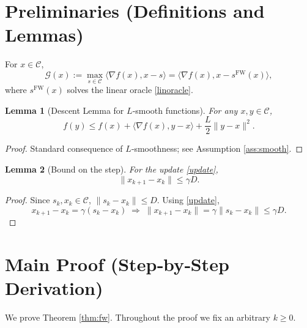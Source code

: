 \documentclass{article}
\newtheorem{lemma}{Lemma}
\newcommand{\Cset}{\mathcal{C}}
\newcommand{\grad}{\nabla}
\newcommand{\gap}{\mathcal{G}}
\newcommand{\inner}[2]{\langle #1,#2\rangle}
\begin{document}
\section*{Preliminaries (Definitions and Lemmas)}
\begin{definition}[FW gap]
For $x\in\Cset$,
\[
\gap(x):=\max_{s\in\Cset}\inner{\grad f(x)}{x-s}
       =\inner{\grad f(x)}{x-s^{\mathrm{FW}}(x)},
\]
where $s^{\mathrm{FW}}(x)$ solves the linear oracle \eqref{linoracle}.
\end{definition}
\begin{lemma}[Descent Lemma for $L$‑smooth functions]\label{lem:descent}
For any $x,y\in\Cset$,
\[
f(y)\le f(x)+\inner{\grad f(x)}{y-x}
          +\frac{L}{2}\|y-x\|^{2}.
\tag{L1}
\]
\end{lemma}
\begin{proof}
Standard consequence of $L$‑smoothness; see Assumption \ref{ass:smooth}.
\end{proof}
\begin{lemma}[Bound on the step]\label{lem:stepbound}
For the update \eqref{update},
\[
\|x_{k+1}-x_{k}\|\le \gamma D .
\tag{L2}
\]
\end{lemma}
\begin{proof}
Since $s_{k},x_{k}\in\Cset$, $\|s_{k}-x_{k}\|\le D$.  Using \eqref{update},
\[
x_{k+1}-x_{k}= \gamma (s_{k}-x_{k})\;\Rightarrow\;
\|x_{k+1}-x_{k}\|=\gamma\|s_{k}-x_{k}\|\le\gamma D .
\]
\end{proof}

\newpage
\section*{Main Proof (Step‑by‑Step Derivation)}
We prove Theorem \ref{thm:fw}.  Throughout the proof we fix an arbitrary $k\ge0$.
\end{document}
